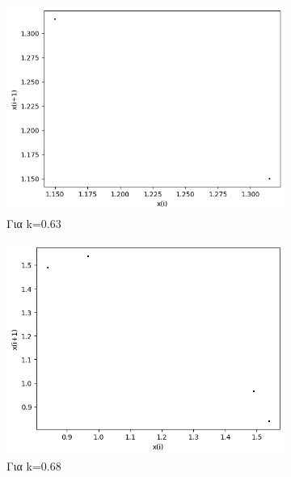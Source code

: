 \begin{figure}[h!]
\begin{subfigure}[b]{0.4\textwidth}
		\includegraphics[width=\textwidth]{LateX images/graphs q12/g5}
		\caption{Για k=0.63}
		\label{f:k61}
	\end{subfigure}
	\hfill
	\begin{subfigure}[b]{0.4\textwidth}
		\centering
		\includegraphics[width=\textwidth]{LateX images/graphs q12/g6}
		\caption{Για k=0.68}
		\label{f:k62}
	\end{subfigure}
	\hfill
	\begin{subfigure}[b]{0.4\textwidth}
		\centering

\end{subfigure}
\end{figure}
